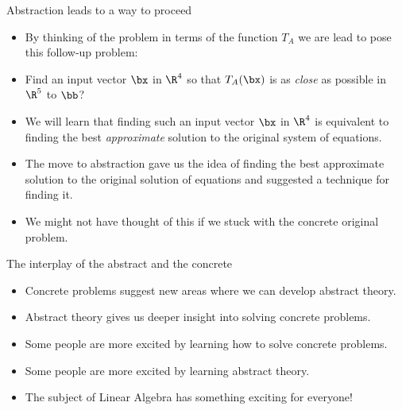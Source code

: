 \documentclass{beamer}
\begin{document}
\begin{frame} {Abstraction leads to a way to proceed}
\begin{itemize}
\item By thinking of the problem in terms of the function $T_A$ we are lead
to pose this follow-up problem:
\item Find an input vector $\bx$ in $\R^4$ so that $T_A(\bx)$ is as \emph{close} as possible
in $\R^5$ to $\bb$?
\item We will learn that finding such an input vector $\bx$ in $\R^4$ is equivalent to finding the
best \emph{approximate} solution to the original system of equations.
\item The move to abstraction gave us the idea of finding the best approximate solution to the
original solution of equations and suggested a technique for finding it.
\item We might not have thought of this if we stuck with the concrete original problem.
\end{itemize}
\end{frame}

\begin{frame}{The interplay of the abstract and the concrete}
\begin{itemize}
\item Concrete problems suggest new areas where we can develop abstract theory.
\item Abstract theory gives us deeper insight into solving concrete problems.
\item Some people are more excited by learning how to solve concrete problems.
\item Some people are more excited by learning abstract theory.
\item The subject of Linear Algebra has something exciting for everyone!
\end{itemize}
\end{frame}
\end{document}
